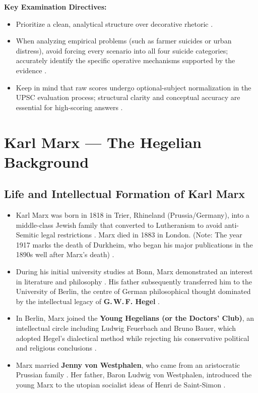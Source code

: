 \begin{PYQLink}
\textbf{Key Examination Directives:}
\begin{itemize}
    \item Prioritize a clean, analytical structure over decorative rhetoric .
    \item When analyzing empirical problems (such as farmer suicides or urban distress), avoid forcing every scenario into all four suicide categories; accurately identify the specific operative mechanisms supported by the evidence .
    \item Keep in mind that raw scores undergo optional-subject normalization in the UPSC evaluation process; structural clarity and conceptual accuracy are essential for high-scoring answers .
\end{itemize}
\end{PYQLink}

\sectiondivider

\section{Karl Marx --- The Hegelian Background}

\subsection{Life and Intellectual Formation of Karl Marx}

\begin{itemize}
    \item Karl Marx was born in 1818 in Trier, Rhineland (Prussia/Germany), into a middle-class Jewish family that converted to Lutheranism to avoid anti-Semitic legal restrictions . Marx died in 1883 in London. (Note: The year 1917 marks the death of Durkheim, who began his major publications in the 1890s well after Marx's death) .
    \item During his initial university studies at Bonn, Marx demonstrated an interest in literature and philosophy . His father subsequently transferred him to the University of Berlin, the centre of German philosophical thought dominated by the intellectual legacy of \textbf{G.\,W.\,F. Hegel} .
    \item In Berlin, Marx joined the \textbf{Young Hegelians (or the Doctors' Club)}, an intellectual circle including Ludwig Feuerbach and Bruno Bauer, which adopted Hegel's dialectical method while rejecting his conservative political and religious conclusions .
    \item Marx married \textbf{Jenny von Westphalen}, who came from an aristocratic Prussian family . Her father, Baron Ludwig von Westphalen, introduced the young Marx to the utopian socialist ideas of Henri de Saint-Simon .
\end{itemize}

